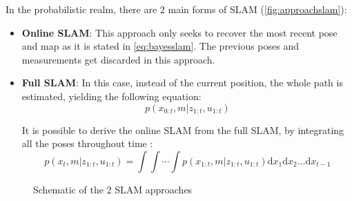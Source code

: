 In the probabilistic realm, there are 2 main forms of SLAM (\autoref{fig:approachslam}):
\begin{itemize}
  \item \textbf{Online SLAM}: This approach only seeks to recover the most recent pose and map as it is stated in \autoref{eq:bayesslam}. The previous poses and measurements get discarded in this approach.
  
  \item \textbf{Full SLAM}: In this case, instead of the current position, the whole path is estimated, yielding the following equation:
  \begin{equation}
    p(x_{0:t},m|z_{1:t},u_{1:t})
    \label{eq:fullslam}
  \end{equation}

  It is possible to derive the online SLAM from the full SLAM, by integrating all the poses throughout time :
  \begin{equation}
    p(x_t,m|z_{1:t},u_{1:t}) = \int\int\!\cdots\!\int p(x_{1:t},m|z_{1:t},u_{1:t})\mathrm{d}x_1\mathrm{d}x_2\ldots\mathrm{d}x_{t-1}
    \label{eq:onlinetofull}
  \end{equation}
\end{itemize}

\begin{figure}[htb]
  \centering
   \quad
  \caption{Schematic of the 2 SLAM approaches}
  \label{fig:approachslam}
\end{figure}

